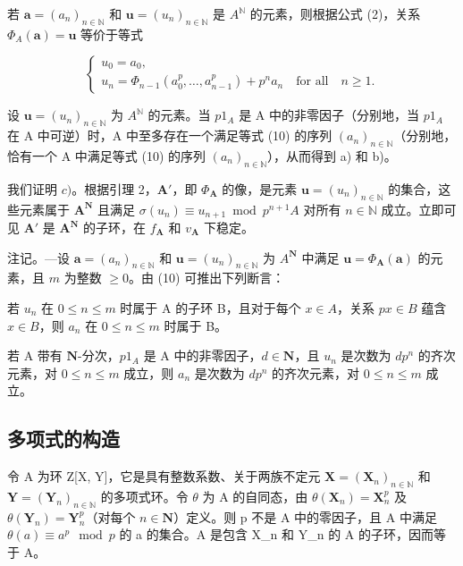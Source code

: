 若 \(\boldsymbol{a} = (a_n)_{n \in \mathbb{N}}\) 和 \(\boldsymbol{u} = (u_n)_{n \in \mathbb{N}}\) 是 \(A^{\mathbb{N}}\) 的元素，则根据公式 (2)，关系 \(\Phi_A(\boldsymbol{a}) = \boldsymbol{u}\) 等价于等式

\[
\left\{ \begin{array}{l} u _ {0} = a _ {0}, \\ u _ {n} = \Phi_ {n - 1} \left(a _ {0} ^ {p}, \dots , a _ {n - 1} ^ {p}\right) + p ^ {n} a _ {n} \quad \text {for all} \quad n \geqslant 1. \end{array} \right.\tag{10}
\]

  设 \(\boldsymbol{u} = (u_{n})_{n \in \mathbb{N}}\) 为 \(A^{\mathbb{N}}\) 的元素。当 \(p1_{A}\) 是 A 中的非零因子（分别地，当 \(p1_{A}\) 在 A 中可逆）时，A 中至多存在一个满足等式 (10) 的序列 \((a_{n})_{n \in \mathbb{N}}\)（分别地，恰有一个 A 中满足等式 (10) 的序列 \((a_{n})_{n \in \mathbb{N}}\)），从而得到 a) 和 b)。

 我们证明 \(c)\)。根据引理 2，\(\mathbf{A}'\)，即 \(\Phi_{\mathbf{A}}\) 的像，是元素 \(\boldsymbol{u} = (u_n)_{n \in \mathbb{N}}\) 的集合，这些元素属于 \(\mathbf{A}^{\mathbf{N}}\) 且满足 \(\sigma(u_n) \equiv u_{n+1} \bmod p^{n+1}A\) 对所有 \(n \in \mathbb{N}\) 成立。立即可见 \(\mathbf{A}'\) 是 \(\mathbf{A}^{\mathbf{N}}\) 的子环，在 \(f_{\mathbf{A}}\) 和 \(v_{\mathbf{A}}\) 下稳定。

注记。—设 \(\boldsymbol{a} = (a_n)_{n \in \mathbb{N}}\) 和 \(\boldsymbol{u} = (u_n)_{n \in \mathbb{N}}\) 为 \(A^{\mathbf{N}}\) 中满足 \(\boldsymbol{u} = \Phi_{\mathbf{A}}(\boldsymbol{a})\) 的元素，且 \(m\) 为整数 \(\geqslant 0\)。由 (10) 可推出下列断言：

若 \(u_n\) 在 \(0 \leqslant n \leqslant m\) 时属于 A 的子环 B，且对于每个 \(x \in A\)，关系 \(px \in B\) 蕴含 \(x \in B\)，则 \(a_n\) 在 \(0 \leqslant n \leqslant m\) 时属于 B。

若 A 带有 \(\mathbf{N}\)-分次，\(p1_{A}\) 是 A 中的非零因子，\(d \in \mathbf{N}\)，且 \(u_{n}\) 是次数为 \(dp^{n}\) 的齐次元素，对 \(0 \leqslant n \leqslant m\) 成立，则 \(a_{n}\) 是次数为 \(dp^{n}\) 的齐次元素，对 \(0 \leqslant n \leqslant m\) 成立。

\subsection{多项式的构造}

令 A 为环 Z{[}X, Y{]}，它是具有整数系数、关于两族不定元 \(\mathbf{X} = (\mathbf{X}_{n})_{n \in \mathbb{N}}\) 和 \(\mathbf{Y} = (\mathbf{Y}_{n})_{n \in \mathbb{N}}\) 的多项式环。令 \(\theta\) 为 A 的自同态，由 \(\theta(\mathbf{X}_{n}) = \mathbf{X}_{n}^{p}\) 及 \(\theta(\mathbf{Y}_{n}) = \mathbf{Y}_{n}^{p}\)（对每个 \(n \in \mathbf{N}\)）定义。则 p 不是 A 中的零因子，且 A 中满足 \(\theta(a) \equiv a^{p} \mod p\) 的 a 的集合。A 是包含 X\_n 和 Y\_n 的 A 的子环，因而等于 A。

